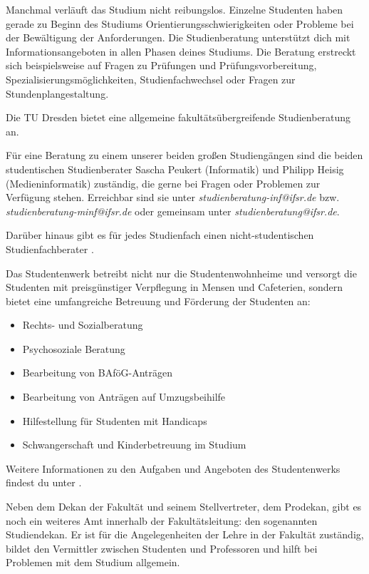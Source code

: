 Manchmal verläuft das Studium nicht reibungslos.
Einzelne Studenten haben gerade zu Beginn des Studiums Orientierungsschwierigkeiten oder Probleme bei der Bewältigung der Anforderungen.
Die Studienberatung unterstützt dich mit Informationsangeboten in allen Phasen deines Studiums.
Die Beratung erstreckt sich beispielsweise auf Fragen zu Prüfungen und Prüfungsvorbereitung, Spezialisierungsmöglichkeiten, Studienfachwechsel oder Fragen zur Stundenplangestaltung.

Die TU Dresden bietet eine allgemeine fakultätsübergreifende Studienberatung  an.

Für eine Beratung zu einem unserer beiden großen Studiengängen sind die beiden studentischen Studienberater Sascha Peukert (Informatik) und Philipp Heisig (Medieninformatik) zuständig, die gerne bei Fragen oder Problemen zur Verfügung stehen. Erreichbar sind sie unter \textit{studienberatung-inf@ifsr.de} bzw. \textit{studienberatung-minf@ifsr.de} oder gemeinsam unter \textit{studienberatung@ifsr.de}.

Darüber hinaus gibt es für jedes Studienfach einen nicht-studentischen Studienfachberater .

\newpage

Das Studentenwerk betreibt nicht nur die Studentenwohnheime und versorgt die Studenten mit preisgünstiger Verpflegung in Mensen und Cafeterien, sondern bietet eine umfangreiche Betreuung und Förderung der Studenten an:
\begin{itemize}
\item Rechts- und Sozialberatung
\item Psychosoziale Beratung
\item Bearbeitung von BAföG-Anträgen
\item Bearbeitung von Anträgen auf Umzugsbeihilfe
\item Hilfestellung für Studenten mit Handicaps
\item Schwangerschaft und Kinderbetreuung im Studium
\end{itemize}
Weitere Informationen zu den Aufgaben und Angeboten des Studentenwerks findest du unter .

Neben dem Dekan der Fakultät und seinem Stellvertreter, dem Prodekan, gibt es noch ein weiteres Amt innerhalb der Fakultätsleitung:
den sogenannten Studiendekan.
Er ist für die Angelegenheiten der Lehre in der Fakultät zuständig, bildet den Vermittler zwischen Studenten und Professoren und hilft bei Problemen mit dem Studium allgemein.

